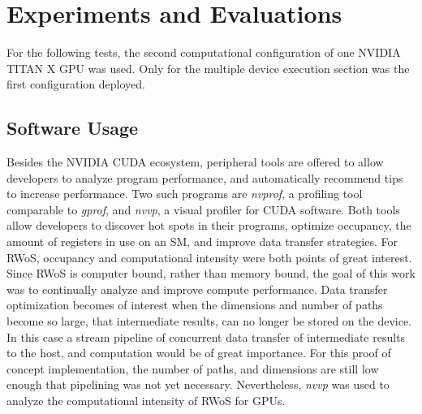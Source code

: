 \chapter{Experiments and Evaluations}
\label{chapter:experiments_and_evaluations}
For the following tests, the second computational configuration of one NVIDIA TITAN X GPU
was used.  Only for the multiple device execution section was the first configuration deployed.
\section{Software Usage}
Besides the NVIDIA CUDA ecosystem, peripheral tools are offered to allow developers
to analyze program performance, and automatically recommend tips to increase performance.
Two such programs are \textit{nvprof}, a profiling tool comparable to \textit{gprof}, and
\textit{nvvp}, a visual profiler for \Gls{CUDA} software. Both tools allow developers
to discover hot spots in their programs, optimize occupancy, the amount of registers
in use on an SM, and improve data transfer strategies.  For \Gls{RWoS}, occupancy
and computational intensity were both points of great interest. Since \Gls{RWoS}
is computer bound, rather than memory bound, the goal of this work was to continually
analyze and improve compute performance.  Data transfer optimization becomes of interest
when the dimensions and number of paths become so large, that intermediate results,
can no longer be stored on the device.  In this case a stream pipeline of concurrent
data transfer of intermediate results to the host, and computation would be of great
importance.  For this proof of concept implementation, the number of paths, and dimensions
are still low enough that pipelining was not yet necessary.  Nevertheless, \textit{nvvp}
was used to analyze the computational intensity of \Gls{RWoS} for \Glspl{GPU}.

